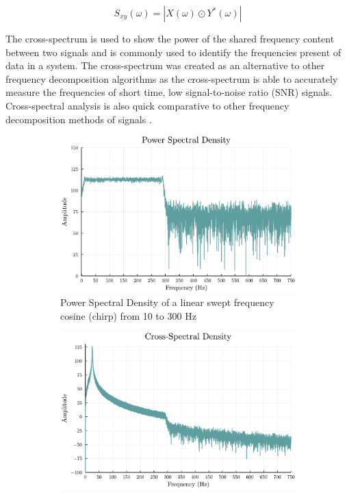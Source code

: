             \begin{equation} \label{eq:CSD}
                S_{xy}(\omega) = |X(\omega) \odot Y^*(\omega)|
            \end{equation}

            The cross-spectrum is used to show the power of the shared frequency content between two signals and is commonly used to identify the frequencies present of data in a system. The cross-spectrum was created as an alternative to other frequency decomposition algorithms as the cross-spectrum is able to accurately measure the frequencies of short time, low signal-to-noise ratio (SNR) signals. Cross-spectral analysis is also quick comparative to other frequency decomposition methods of signals \cite{liu_optimization_2022}.

            \begin{figure} [h]
                \centering
                \begin{subfigure}[c]{0.48\textwidth}
                    \centering
                    \includegraphics[width=\textwidth]{images/Background/Power Spectral Density.pdf}
                    \caption{Power Spectral Density of a linear swept frequency cosine (chirp) from 10 to 300 Hz}
                    \label{fig:PSD Example}
                \end{subfigure}
                \hfill
                \begin{subfigure}[c]{0.49\textwidth}
                    \centering
                    \includegraphics[width=\textwidth]{images/Background/Cross Spectral Density.pdf}

\end{subfigure}
\end{figure}
